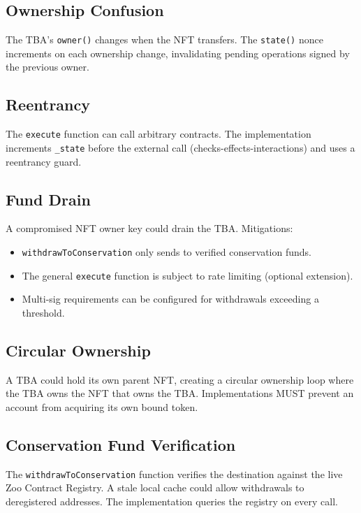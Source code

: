 \documentclass[11pt,letterpaper]{article}
\begin{document}
\subsection{Ownership Confusion}

The TBA's \texttt{owner()} changes when the NFT transfers. The \texttt{state()} nonce increments on each ownership change, invalidating pending operations signed by the previous owner.

\subsection{Reentrancy}

The \texttt{execute} function can call arbitrary contracts. The implementation increments \texttt{\_state} before the external call (checks-effects-interactions) and uses a reentrancy guard.

\subsection{Fund Drain}

A compromised NFT owner key could drain the TBA. Mitigations:
\begin{itemize}
    \item \texttt{withdrawToConservation} only sends to verified conservation funds.
    \item The general \texttt{execute} function is subject to rate limiting (optional extension).
    \item Multi-sig requirements can be configured for withdrawals exceeding a threshold.
\end{itemize}

\subsection{Circular Ownership}

A TBA could hold its own parent NFT, creating a circular ownership loop where the TBA owns the NFT that owns the TBA. Implementations MUST prevent an account from acquiring its own bound token.

\subsection{Conservation Fund Verification}

The \texttt{withdrawToConservation} function verifies the destination against the live Zoo Contract Registry. A stale local cache could allow withdrawals to deregistered addresses. The implementation queries the registry on every call.
\end{document}
